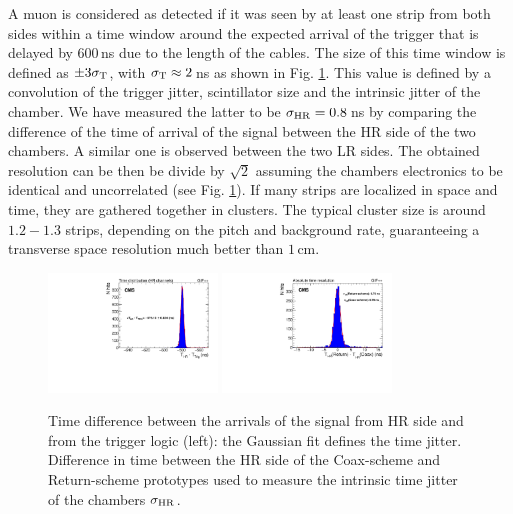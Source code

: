 \documentclass{PoS}
\begin{document}
A muon is considered as detected if it was seen by at least one strip from both sides within a time window around the expected arrival of the trigger that is delayed by $600$\,ns due to the length of the cables. The size of this time window is defined as $\pm3\sigma_{\rm T}$, with $\sigma_{\rm T} \approx 2$\,ns as shown in Fig. \ref{fig.T}. This value is defined by a convolution of the trigger jitter, scintillator size and the intrinsic jitter of the chamber. We have measured the latter to be $\sigma_{\rm HR} = 0.8$\,ns by comparing the difference of the time of arrival of the signal between the HR side of the two chambers. A similar one is observed between the two LR sides. The obtained resolution can be then be divide by $\sqrt{2}$ assuming the chambers electronics to be identical and uncorrelated (see Fig. \ref{fig.T}). If many strips are localized in space and time, they are gathered together in clusters. The typical cluster size is around $1.2-1.3$ strips, depending on the pitch and background rate, guaranteeing a transverse space resolution much better than $1$\,cm.

\begin{figure}
  \begin{center}
    \includegraphics[width=0.40\textwidth]{figs/HR.pdf}
    \includegraphics[width=0.40\textwidth]{figs/DELTA_T.pdf}
  \end{center}
 \caption{Time difference between the arrivals of the signal from HR side and from the trigger logic (left): the Gaussian fit defines the time jitter. Difference in time between the HR side of the Coax-scheme and Return-scheme prototypes used to measure the intrinsic time jitter of the chambers $\sigma_{\rm HR}$.} \label{fig.T}
\end{figure}
\end{document}
